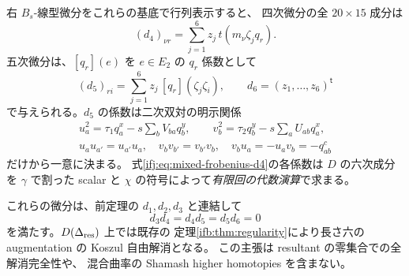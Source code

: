 \begin{theorem}
右 $B_s$-線型微分をこれらの基底で行列表示すると、
四次微分の全 $20\times15$ 成分は
\begin{equation}\label{ifj:eq:mixed-frobenius-d4}
 \boxed{\displaystyle
 (d_4)_{\nu r}=\sum_{j=1}^6z_j\,t(m_\nu\zeta_jq_r).}
\end{equation}
五次微分は、$[q_r](e)$ を $e\in E_2$ の $q_r$ 係数として
\begin{equation}\label{ifj:eq:mixed-frobenius-d5}
 (d_5)_{ri}=\sum_{j=1}^6z_j\,[q_r](\zeta_j\zeta_i),
 \qquad d_6=(z_1,\ldots,z_6)^{\mathsf t}
\end{equation}
で与えられる。$d_5$ の係数は二次双対の明示関係
\begin{equation}\label{ifj:eq:mixed-frobenius-E2-products}
 \begin{gathered}
 u_a^2=\tau_1q_a^x-s\sum_bV_{ba}q_b^y,\qquad
 v_b^2=\tau_2q_b^y-s\sum_aU_{ab}q_a^x,\\
 u_au_{a'}=u_{a'}u_a,\quad v_bv_{b'}=v_{b'}v_b,\quad
 v_bu_a=-u_av_b=-q^c_{ab}
 \end{gathered}
\end{equation}
だけから一意に決まる。
式\eqref{ifj:eq:mixed-frobenius-d4}の各係数は
$D$ の六次成分を $\gamma$ で割った scalar と
$\chi$ の符号によって\emph{有限回の代数演算}で求まる。

これらの微分は、前定理の $d_1,d_2,d_3$ と連結して
\[
 d_3d_4=d_4d_5=d_5d_6=0
\]
を満たす。$D(\Delta_{\rm res})$ 上では既存の
定理\ref{ifb:thm:regularity}により長さ六の
augmentation の Koszul 自由解消となる。
この主張は resultant の零集合での全解消完全性や、
混合曲率の Shamash higher homotopies を含まない。
\end{theorem}

